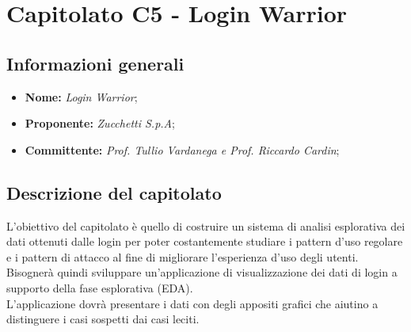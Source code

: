\section{Capitolato C5 - Login Warrior}\label{section:c5}

\subsection{Informazioni generali}
    \begin {itemize}
        \item \textbf{Nome:} \textit{Login Warrior};
        \item \textbf{Proponente:} \textit{Zucchetti S.p.A};
        \item \textbf{Committente:} \textit{Prof. Tullio Vardanega e Prof. Riccardo Cardin};
    \end{itemize}

\subsection{Descrizione del capitolato}
    L’obiettivo del capitolato è quello di costruire un sistema di analisi esplorativa dei dati ottenuti dalle login per poter costantemente studiare i pattern d’uso regolare e i pattern di attacco al fine di migliorare l'esperienza d'uso degli utenti.\\
    Bisognerà quindi sviluppare un’applicazione di visualizzazione dei dati di login a supporto della fase esplorativa (EDA\glo).\\
    L’applicazione dovrà presentare i dati con degli appositi grafici che aiutino a distinguere i casi sospetti dai casi leciti.

